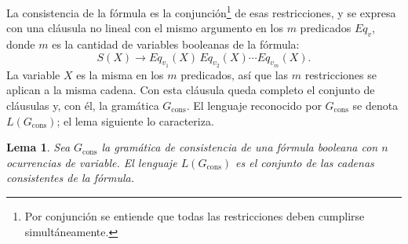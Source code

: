 \documentclass{report}
\theoremstyle{definition}
\theoremstyle{plain}
\newtheorem{lema}{Lema}[chapter]
\begin{document}
La consistencia
de la fórmula es la conjunción\footnote{Por conjunción se entiende que
todas las restricciones deben cumplirse simultáneamente.} de esas
restricciones, y se expresa con
una cláusula no lineal con el mismo argumento en los $m$ predicados
$Eq_v$, donde $m$ es la cantidad de variables booleanas de la fórmula:
\[
  S(X) \to Eq_{v_1}(X)\, Eq_{v_2}(X) \cdots Eq_{v_m}(X).
\]
La variable $X$ es la misma en los $m$ predicados, así que las $m$
restricciones se aplican a la misma cadena. Con esta cláusula queda
completo el conjunto de cláusulas y, con él, la gramática
$G_{\mathrm{cons}}$. El lenguaje reconocido por $G_{\mathrm{cons}}$ se
denota $L(G_{\mathrm{cons}})$; el lema siguiente lo caracteriza.

\begin{lema}
\label{lema:lenguaje-gcons}
Sea $G_{\mathrm{cons}}$ la gramática de consistencia de una fórmula
booleana con $n$ ocurrencias de variable. El lenguaje
$L(G_{\mathrm{cons}})$ es el conjunto de las cadenas consistentes de
la fórmula.
\end{lema}
\end{document}
